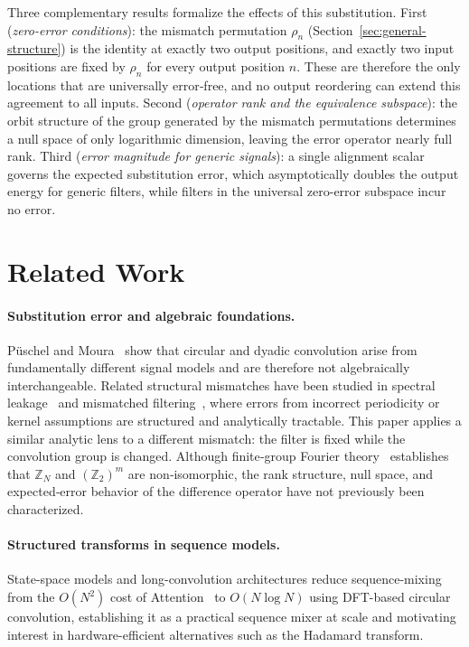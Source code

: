 \documentclass[11pt]{article}
\begin{document}
Three complementary results formalize the effects of this substitution. First (\emph{zero-error conditions}): the mismatch permutation $\rho_n$ (Section~\ref{sec:general-structure}) is the identity at exactly two output positions, and exactly two input positions are fixed by $\rho_n$ for every output position $n$. These are therefore the only locations that are universally error‑free, and no output reordering can extend this agreement to all inputs. Second (\emph{operator rank and the equivalence subspace}): the orbit structure of the group generated by the mismatch permutations determines a null space of only logarithmic dimension, leaving the error operator nearly full rank. Third (\emph{error magnitude for generic signals}): a single alignment scalar governs the expected substitution error, which asymptotically doubles the output energy for generic filters, while filters in the universal zero-error subspace incur no error.


\section{Related Work}

\paragraph{Substitution error and algebraic foundations.}
P\"uschel and Moura~\cite{PueschelMoura2008_ASP_1DSpace, PueschelMoura2008_ASP_Foundation1DTime} show that circular and dyadic convolution arise from fundamentally different signal models and are therefore not algebraically interchangeable. Related structural mismatches have been studied in spectral leakage~\cite{harris1978windows} and mismatched filtering~\cite{turin1960matched}, where errors from incorrect periodicity or kernel assumptions are structured and analytically tractable. This paper applies a similar analytic lens to a different mismatch: the filter is fixed while the convolution group is changed. Although finite‑group Fourier theory~\cite{Terras_1999} establishes that $\mathbb{Z}_N$ and $(\mathbb{Z}_2)^m$ are non‑isomorphic, the rank structure, null space, and expected‑error behavior of the difference operator have not previously been characterized.

\paragraph{Structured transforms in sequence models.}
State-space models \cite{gu2022iclr-efficiently} and long-convolution architectures \cite{poli2023hyenahierarchylargerconvolutional, brixi2026genomemodellingevo2} reduce sequence-mixing from the $O(N^2)$ cost of Attention~\cite{10.5555/3295222.3295349} to $O(N\log N)$ using DFT-based circular convolution, establishing it as a practical sequence mixer at scale and motivating interest in hardware-efficient alternatives such as the Hadamard transform.
\end{document}
